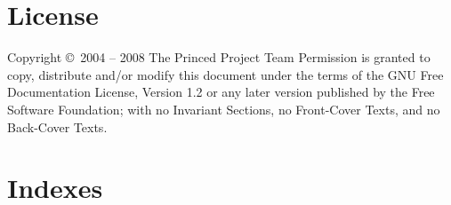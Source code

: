 \documentclass{article}
\begin{document}
\pagebreak[3]
\section{License}

      Copyright \copyright \ 2004 -- 2008 The Princed Project Team
\bigskip
      Permission is granted to copy, distribute and/or modify this document
      under the terms of the GNU Free Documentation License, Version 1.2
      or any later version published by the Free Software Foundation;
      with no Invariant Sections, no Front-Cover Texts, and no Back-Cover
      Texts.

\section*{Indexes}
\listoftables
\listoffigures
\printindex

\end{document}
